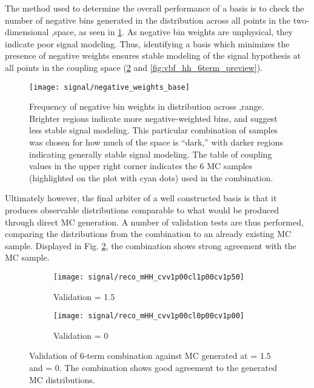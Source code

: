     The method used to determine the overall performance of a basis is to check the number of negative bins generated
        in the \mhh distribution across all points in the two-dimensional \kvv,\kl space, as seen in \ref{fig:vbf_hh_6term_nWeight_grid}.
    As negative bin weights are unphysical, they indicate poor signal modeling.
    Thus, identifying a basis which minimizes the presence of negative weights ensures stable modeling of the signal hypothesis at all points in the coupling space (\ref{fig:vbf_hh_6term_validation} and \ref{fig:vbf_hh_6term_preview}).

    \begin{figure}[tbh]
        \texttt{[image: signal/negative\_weights\_base]}
        \caption{
            Frequency of negative bin weights in \mhh distribution across \kvv,\kl range.
            Brighter regions indicate more negative-weighted bins, and suggest less stable signal modeling.
            This particular combination of samples was chosen for how much of the space is ``dark,''
                with darker regions indicating generally stable signal modeling.
            The table of coupling values in the upper right corner indicates the 6 MC samples
                (highlighted on the plot with cyan dots) used in the combination.
        }
        \label{fig:vbf_hh_6term_nWeight_grid}
    \end{figure}

    Ultimately however, the final arbiter of a well constructed basis is that it produces observable distributions comparable to what would be produced through direct MC generation.
    A number of validation tests are thus performed, comparing the distributions from the combination to an already existing MC sample.
    Displayed in Fig. \ref{fig:vbf_hh_6term_validation}, the combination shows strong agreement with the MC sample.

    \begin{figure}[tbh]
        \begin{subfigure}{0.48\textwidth}
            \texttt{[image: signal/reco\_mHH\_cvv1p00cl1p00cv1p50]}
            \captionsetup{justification=centering} \caption{Validation \kv = 1.5}
        \end{subfigure}
        \begin{subfigure}{0.48\textwidth}
            \texttt{[image: signal/reco\_mHH\_cvv1p00cl0p00cv1p00]}
            \captionsetup{justification=centering} \caption{Validation \kl = 0}
        \end{subfigure}
        \caption{
            Validation of 6-term combination against MC generated at \kv = 1.5 and \kl = 0.
            The combination shows good agreement to the generated MC distributions.
        }
        \label{fig:vbf_hh_6term_validation}
    \end{figure}

